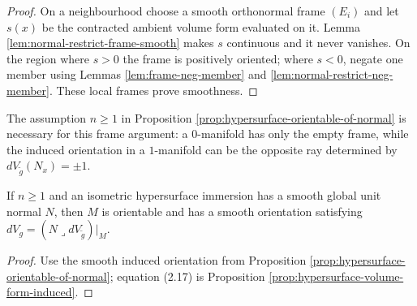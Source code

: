 \begin{proof}

\sketch On a neighbourhood choose a smooth orthonormal frame $(E_i)$ and let $s(x)$ be the contracted ambient volume form evaluated on it. Lemma \ref{lem:normal-restrict-frame-smooth} makes $s$ continuous and it never vanishes. On the region where $s>0$ the frame is positively oriented; where $s<0$, negate one member using Lemmas \ref{lem:frame-neg-member} and \ref{lem:normal-restrict-neg-member}. These local frames prove smoothness.
\end{proof}

\begin{remark}
\label{rem:hypersurface-orientation-dimension}

The assumption $n\ge1$ in Proposition \ref{prop:hypersurface-orientable-of-normal} is necessary for this frame argument: a $0$-manifold has only the empty frame, while the induced orientation in a $1$-manifold can be the opposite ray determined by $dV_{\widetilde g}(N_x)=\pm1$.
\end{remark}

\begin{proposition}
\label{prop:hypersurface-volume-form-if}





If $n\ge1$ and an isometric hypersurface immersion has a smooth global unit normal $N$, then $M$ is orientable and has a smooth orientation satisfying $dV_g=(N\lrcorner dV_{\widetilde g})|_M$.
\end{proposition}

\begin{proof}

\sketch Use the smooth induced orientation from Proposition \ref{prop:hypersurface-orientable-of-normal}; equation (2.17) is Proposition \ref{prop:hypersurface-volume-form-induced}.
\end{proof}

